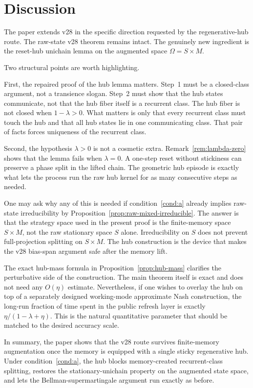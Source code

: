 \documentclass[11pt]{article}
\theoremstyle{definition}
\newcommand{\1}{\mathbf{1}}
\begin{document}
\section{Discussion}\label{sec:discussion}

The paper extends v28 in the specific direction requested by the regenerative-hub route. The raw-state v28 theorem remains intact. The genuinely new ingredient is the reset-hub unichain lemma on the augmented space $\Omega=S\times M$.

Two structural points are worth highlighting.

First, the repaired proof of the hub lemma matters. Step~1 must be a closed-class argument, not a transience slogan. Step~2 must show that the hub states communicate, not that the hub fiber itself is a recurrent class. The hub fiber is not closed when $1-\lambda>0$. What matters is only that every recurrent class must touch the hub and that all hub states lie in one communicating class. That pair of facts forces uniqueness of the recurrent class.

Second, the hypothesis $\lambda>0$ is not a cosmetic extra. Remark~\ref{rem:lambda-zero} shows that the lemma fails when $\lambda=0$. A one-step reset without stickiness can preserve a phase split in the lifted chain. The geometric hub episode is exactly what lets the process run the raw hub kernel for as many consecutive steps as needed.

One may ask why any of this is needed if condition~\ref{cond:a} already implies raw-state irreducibility by Proposition~\ref{prop:raw-mixed-irreducible}. The answer is that the strategy space used in the present proof is the finite-memory space $S\times M$, not the raw stationary space $S$ alone. Irreducibility on $S$ does not prevent full-projection splitting on $S\times M$. The hub construction is the device that makes the v28 bias-span argument safe after the memory lift.

The exact hub-mass formula in Proposition~\ref{prop:hub-mass} clarifies the perturbative side of the construction. The main theorem itself is exact and does not need any $O(\eta)$ estimate. Nevertheless, if one wishes to overlay the hub on top of a separately designed working-mode approximate Nash construction, the long-run fraction of time spent in the public refresh layer is exactly $\eta/(1-\lambda+\eta)$. This is the natural quantitative parameter that should be matched to the desired accuracy scale.

In summary, the paper shows that the v28 route survives finite-memory augmentation once the memory is equipped with a single sticky regenerative hub. Under condition~\ref{cond:a}, the hub blocks memory-created recurrent-class splitting, restores the stationary-unichain property on the augmented state space, and lets the Bellman-supermartingale argument run exactly as before.
\end{document}
